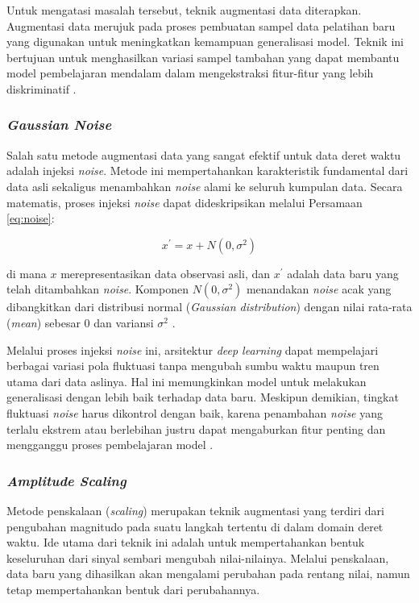 Untuk mengatasi masalah tersebut, teknik augmentasi data diterapkan. Augmentasi data merujuk pada proses pembuatan sampel data pelatihan baru yang digunakan untuk meningkatkan kemampuan generalisasi model. Teknik ini bertujuan untuk menghasilkan variasi sampel tambahan yang dapat membantu model pembelajaran mendalam dalam mengekstraksi fitur-fitur yang lebih diskriminatif \cite{akyash2021dtw}.

\subsubsection{\textit{Gaussian Noise}}
Salah satu metode augmentasi data yang sangat efektif untuk data deret waktu adalah injeksi \textit{noise}. Metode ini mempertahankan karakteristik fundamental dari data asli sekaligus menambahkan \textit{noise} alami ke seluruh kumpulan data. Secara matematis, proses injeksi \textit{noise} dapat dideskripsikan melalui Persamaan \ref{eq:noise}:

\begin{equation}
\label{eq:noise}
x^{\prime} = x + N(0,\sigma^{2})
\end{equation}
\vspace{1em}

di mana $x$ merepresentasikan data observasi asli, dan $x^{\prime}$ adalah data baru yang telah ditambahkan \textit{noise}. Komponen $N(0,\sigma^{2})$ menandakan \textit{noise} acak yang dibangkitkan dari distribusi normal (\textit{Gaussian distribution}) dengan nilai rata-rata (\textit{mean}) sebesar 0 dan variansi $\sigma^{2}$ \cite{kim2024timeseries}. 

Melalui proses injeksi \textit{noise} ini, arsitektur \textit{deep learning} dapat mempelajari berbagai variasi pola fluktuasi tanpa mengubah sumbu waktu maupun tren utama dari data aslinya. Hal ini memungkinkan model untuk melakukan generalisasi dengan lebih baik terhadap data baru. Meskipun demikian, tingkat fluktuasi \textit{noise} harus dikontrol dengan baik, karena penambahan \textit{noise} yang terlalu ekstrem atau berlebihan justru dapat mengaburkan fitur penting dan mengganggu proses pembelajaran model \cite{kim2024timeseries}.

\subsubsection{\textit{Amplitude Scaling}}
Metode penskalaan (\textit{scaling}) merupakan teknik augmentasi yang terdiri dari pengubahan magnitudo pada suatu langkah tertentu di dalam domain deret waktu. Ide utama dari teknik ini adalah untuk mempertahankan bentuk keseluruhan dari sinyal sembari mengubah nilai-nilainya. Melalui penskalaan, data baru yang dihasilkan akan mengalami perubahan pada rentang nilai, namun tetap mempertahankan bentuk dari perubahannya. 

